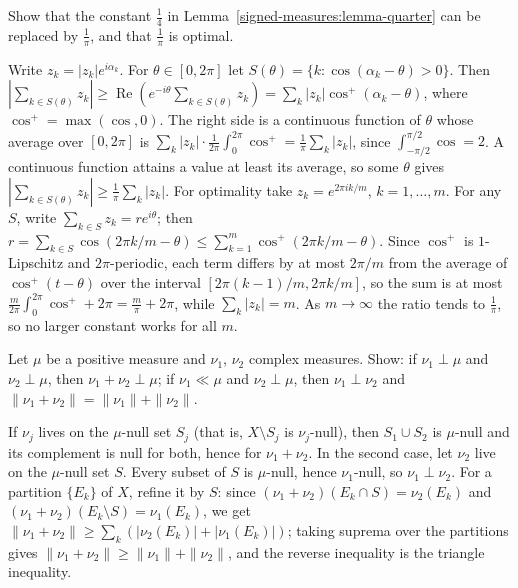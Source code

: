 \begin{exercise}\label{signed-measures:exercise-one-over-pi}
Show that the constant $\frac14$ in Lemma~\ref{signed-measures:lemma-quarter} can be replaced by $\frac1\pi$, and that $\frac1\pi$ is optimal.
\end{exercise}

\begin{solution}
Write $z_k = |z_k|e^{i\alpha_k}$. For $\theta \in [0, 2\pi]$ let $S(\theta) = \{k : \cos(\alpha_k - \theta) > 0\}$. Then
$|\sum_{k \in S(\theta)}z_k| \geq \operatorname{Re}(e^{-i\theta}\sum_{k \in S(\theta)}z_k) = \sum_k|z_k|\cos^+(\alpha_k - \theta)$, where $\cos^+ = \max(\cos, 0)$. The right side is a continuous function of
$\theta$ whose average over $[0, 2\pi]$ is $\sum_k|z_k|\cdot\frac{1}{2\pi}\int_0^{2\pi}\cos^+ = \frac1\pi\sum_k|z_k|$, since $\int_{-\pi/2}^{\pi/2}\cos = 2$. A continuous function attains a value at least its
average, so some $\theta$ gives $|\sum_{k \in S(\theta)}z_k| \geq \frac1\pi\sum_k|z_k|$. For optimality take $z_k = e^{2\pi ik/m}$, $k = 1, \ldots, m$. For any $S$, write
$\sum_{k \in S}z_k = re^{i\theta}$; then $r = \sum_{k \in S}\cos(2\pi k/m - \theta) \leq \sum_{k=1}^m\cos^+(2\pi k/m - \theta)$. Since $\cos^+$ is $1$-Lipschitz and $2\pi$-periodic, each term differs by at most $2\pi/m$ from the
average of $\cos^+(t - \theta)$ over the interval $[2\pi(k - 1)/m, 2\pi k/m]$, so the sum is at most $\frac{m}{2\pi}\int_0^{2\pi}\cos^+ + 2\pi = \frac m\pi + 2\pi$, while $\sum_k|z_k| = m$. As $m \to \infty$
the ratio tends to $\frac1\pi$, so no larger constant works for all $m$.
\end{solution}

\begin{exercise}\label{signed-measures:exercise-singular-sums}
Let $\mu$ be a positive measure and $\nu_1$, $\nu_2$ complex measures. Show: if $\nu_1 \perp \mu$ and $\nu_2 \perp \mu$, then $\nu_1 + \nu_2 \perp \mu$; if $\nu_1 \ll \mu$ and $\nu_2 \perp \mu$, then
$\nu_1 \perp \nu_2$ and $\|\nu_1 + \nu_2\| = \|\nu_1\| + \|\nu_2\|$.
\end{exercise}

\begin{solution}
If $\nu_j$ lives on the $\mu$-null set $S_j$ (that is, $X \setminus S_j$ is $\nu_j$-null), then $S_1 \cup S_2$ is $\mu$-null and its complement is null for both, hence for $\nu_1 + \nu_2$. In the second
case, let $\nu_2$ live on the $\mu$-null set $S$. Every subset of $S$ is $\mu$-null, hence $\nu_1$-null, so $\nu_1 \perp \nu_2$. For a partition $\{E_k\}$ of $X$, refine it by $S$: since
$(\nu_1 + \nu_2)(E_k \cap S) = \nu_2(E_k)$ and $(\nu_1 + \nu_2)(E_k \setminus S) = \nu_1(E_k)$, we get $\|\nu_1 + \nu_2\| \geq \sum_k(|\nu_2(E_k)| + |\nu_1(E_k)|)$; taking suprema over the partitions
gives $\|\nu_1 + \nu_2\| \geq \|\nu_1\| + \|\nu_2\|$, and the reverse inequality is the triangle inequality.
\end{solution}

